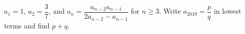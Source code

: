 $a_1=1$, $a_2=\dfrac{3}{7}$, and $a_n=\dfrac{a_{n-2}a_{n-1}}{2a_{n-2}-a_{n-1}}$ for $n\ge3$. Write $a_{2019}=\dfrac{p}{q}$ in lowest terms and find $p+q$.

